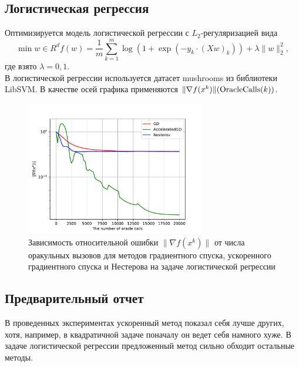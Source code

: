 \documentclass{article}
\begin{document}
\subsection{Логистическая регрессия}
Оптимизируется модель логистической регрессии с $L_2$-регуляризацией вида
\begin{equation}
 \min\limits{w \in R^d} f(w) = \frac{1}{m}\sum\limits_{k = 1}^m \log(1 + \exp(-y_k \cdot (Xw)_k)) + \lambda \|w\|_2^2,
\end{equation}
где взято $\lambda = 0,1$.\\
В логистической регрессии используется датасет mushrooms из библиотеки LibSVM. В качестве осей графика применяются $\|\nabla f(x^k)\| (\textnormal{OracleCalls}(k))$.
\begin{figure}[!htbp]
\centering
  \includegraphics[width=0.7\textwidth]{../figures/Non_stochastic_Logreg_GD_AGD_Nesterov_15_1e-07_1e-05.pdf}
 \caption{Зависимость относительной ошибки $\|\nabla f(x^k)\|$ от числа оракульных вызовов для методов градиентного спуска, ускоренного градиентного спуска и Нестерова на задаче логистической регрессии}
  \label{fig:non-stochastic_logreg}
\end{figure}
\subsection{Предварительный отчет}
В проведенных экспериментах ускоренный метод показал себя лучше других, хотя, например, в квадратичной задаче поначалу он ведет себя намного хуже. В задаче логистической регрессии предложенный метод сильно обходит остальные методы.


\end{document}
